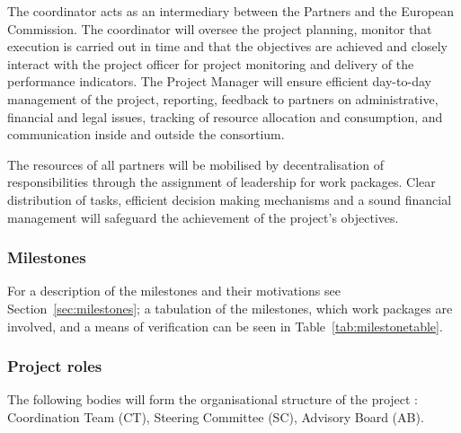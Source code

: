 The coordinator acts as an intermediary between the Partners and
the European Commission. The coordinator will oversee the project
planning, monitor that execution is carried out in time and that
the objectives are achieved and closely interact with the project
officer for project monitoring and delivery of the performance
indicators.  The Project Manager will ensure  efficient day-to-day
management of the project, reporting, feedback to partners on
administrative, financial and legal issues, tracking of  resource
allocation and consumption, and communication inside and outside the
consortium.

The resources of all partners will be mobilised by decentralisation of
responsibilities through the assignment of leadership for work
packages. Clear distribution of tasks, efficient decision making
mechanisms and a sound financial management will safeguard the
achievement of the project's objectives.

\ifgrantagreement\else
\subsubsection{Milestones}
For a description of the milestones and their motivations see
Section~\ref{sec:milestones}; a tabulation of the milestones, which work packages
are involved, and a means of verification can be seen in Table~\ref{tab:milestonetable}.

\milestonetable
\fi

\subsubsection{Project roles}


The following bodies will form the organisational structure of the
\TheProject project : Coordination Team (CT), Steering Committee (SC),
Advisory Board (AB).%

